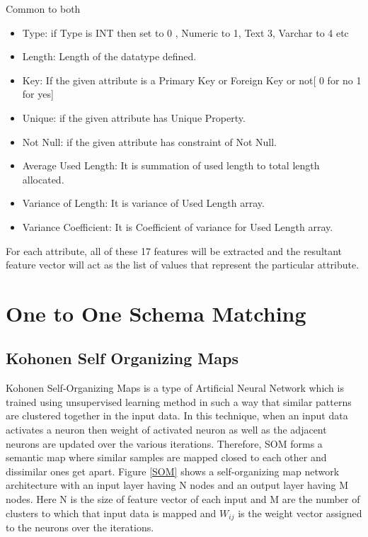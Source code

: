 \documentclass[conference]{IEEEtran}
\begin{document}
Common to both
\begin{itemize}
\item Type: if Type is INT then set to 0 , Numeric to 1, Text 3, Varchar to 4 etc
\item Length: Length of the datatype defined.
\item Key: If the given attribute is a Primary Key or Foreign Key or not[ 0 for no 1 for yes]
\item Unique: if the given attribute has Unique Property.
\item Not Null: if the given attribute has constraint of Not Null.
\item Average Used Length: It is summation of used length to total length allocated.
\item Variance of Length: It is variance of Used Length array.
\item Variance Coefficient: It is Coefficient of variance for Used Length array.
\end{itemize}

For each attribute, all of these 17 features will be extracted and the resultant feature vector will act as the list of values that represent the particular attribute.

\section{One to One Schema Matching}


\subsection{Kohonen Self Organizing Maps}
Kohonen Self-Organizing Maps is a type of Artificial Neural Network which is trained using unsupervised learning method in such a way that similar patterns are clustered together in the input data.
In this technique, when an input data activates a neuron then weight of activated neuron as well as the adjacent neurons are updated over the various iterations. Therefore, SOM forms a semantic map where similar samples are mapped closed to each other and dissimilar ones get apart.
Figure \ref{SOM} shows a self-organizing map network architecture with an input layer having N nodes and an output layer having M nodes. Here N is the size of feature vector of each input and M are the number of clusters to which that input data is mapped and $W_{ij}$ is the weight vector assigned to the neurons over the iterations.
\end{document}
